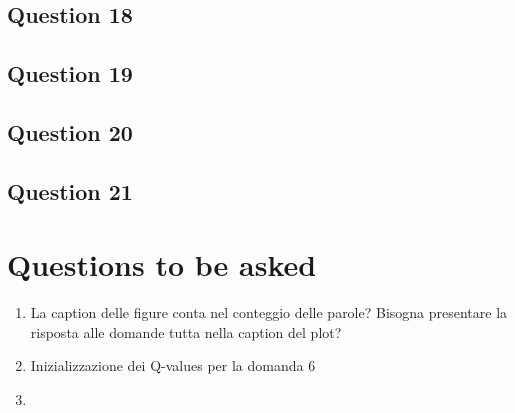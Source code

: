 \documentclass[10pt]{IEEEtran}
\begin{document}
\subsection*{Question 18}
\subsection*{Question 19}
\subsection*{Question 20}
\subsection*{Question 21}

\section*{Questions to be asked}
\begin{enumerate}
    \item La caption delle figure conta nel conteggio delle parole? Bisogna presentare la risposta alle domande tutta nella caption del plot?
    \item Inizializzazione dei Q-values per la domanda 6
    \item 
\end{enumerate}


\nocite{*}
\printbibliography

\clearpage
{}
\end{document}

